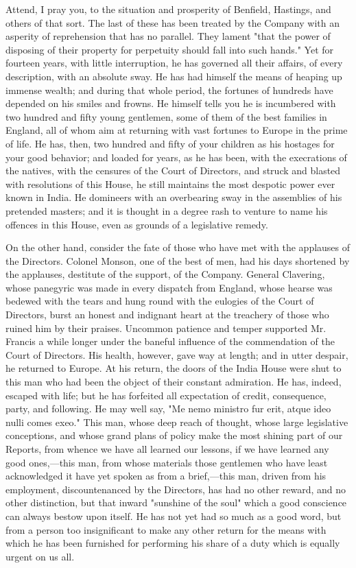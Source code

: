 Attend, I pray you, to the situation and prosperity of Benfield, Hastings, and others of that sort. The last of these has been treated by the Company with an asperity of reprehension that has no parallel. They lament "that the power of disposing of their property for perpetuity should fall into such hands." Yet for fourteen years, with little interruption, he has governed all their affairs, of every description, with an absolute sway. He has had himself the means of heaping up immense wealth; and during that whole period, the fortunes of hundreds have depended on his smiles and frowns. He himself tells you he is incumbered with two hundred and fifty young gentlemen, some of them of the best families in England, all of whom aim at returning with vast fortunes to Europe in the prime of life. He has, then, two hundred and fifty of your children as his hostages for your good behavior; and loaded for years, as he has been, with the execrations of the natives, with the censures of the Court of Directors, and struck and blasted with resolutions of this House, he still maintains the most despotic power ever known in India. He domineers with an overbearing sway in the assemblies of his pretended masters; and it is thought in a degree rash to venture to name his offences in this House, even as grounds of a legislative remedy.

On the other hand, consider the fate of those who have met with the applauses of the Directors. Colonel Monson, one of the best of men, had his days shortened by the applauses, destitute of the support, of the Company. General Clavering, whose panegyric was made in every dispatch from England, whose hearse was bedewed with the tears and hung round with the eulogies of the Court of Directors, burst an honest and indignant heart at the treachery of those who ruined him by their praises. Uncommon patience and temper supported Mr. Francis a while longer under the baneful influence of the commendation of the Court of Directors. His health, however, gave way at length; and in utter despair, he returned to Europe. At his return, the doors of the India House were shut to this man who had been the object of their constant admiration. He has, indeed, escaped with life; but he has forfeited all expectation of credit, consequence, party, and following. He may well say, "Me nemo ministro fur erit, atque ideo nulli comes exeo." This man, whose deep reach of thought, whose large legislative conceptions, and whose grand plans of policy make the most shining part of our Reports, from whence we have all learned our lessons, if we have learned any good ones,—this man, from whose materials those gentlemen who have least acknowledged it have yet spoken as from a brief,—this man, driven from his employment, discountenanced by the Directors, has had no other reward, and no other distinction, but that inward "sunshine of the soul" which a good conscience can always bestow upon itself. He has not yet had so much as a good word, but from a person too insignificant to make any other return for the means with which he has been furnished for performing his share of a duty which is equally urgent on us all.

